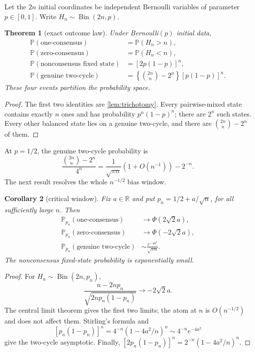 \documentclass[11pt,a4paper]{amsart}
\newtheorem{theorem}{Theorem}[section]
\newtheorem{corollary}[theorem]{Corollary}
\theoremstyle{definition}
\theoremstyle{remark}
\newcommand{\Bin}{\operatorname{Bin}}
\newcommand{\Prob}{\mathbb P}
\begin{document}
Let the $2n$ initial coordinates be independent Bernoulli variables of
parameter $p\in[0,1]$.  Write $H_n\sim\Bin(2n,p)$.

\begin{theorem}[exact outcome law]\label{thm:bernoulli}
Under Bernoulli$(p)$ initial data,
\begin{align*}
 \Prob(\text{one-consensus})&=\Prob(H_n>n),\\
 \Prob(\text{zero-consensus})&=\Prob(H_n<n),\\
 \Prob(\text{nonconsensus fixed state})&=[2p(1-p)]^n,\\
 \Prob(\text{genuine two-cycle})
 &=\left\{\binom{2n}{n}-2^n\right\}[p(1-p)]^n.
\end{align*}
These four events partition the probability space.
\end{theorem}

\begin{proof}
The first two identities are \cref{lem:trichotomy}.  Every pairwise-mixed
state contains exactly $n$ ones and has probability $p^n(1-p)^n$; there are
$2^n$ such states.  Every other balanced state lies on a genuine two-cycle,
and there are $\binom{2n}{n}-2^n$ of them.
\end{proof}

At $p=1/2$, the genuine two-cycle probability is
\[
 \frac{\binom{2n}{n}-2^n}{4^n}
 =\frac{1}{\sqrt{\pi n}}(1+O(n^{-1}))-2^{-n}.
\]
The next result resolves the whole $n^{-1/2}$ bias window.

\begin{corollary}[critical window]\label{cor:window}
Fix $a\in\mathbb R$ and put $p_n=1/2+a/\sqrt n$, for all sufficiently large
$n$.  Then
\begin{align*}
 \Prob_{p_n}(\text{one-consensus})&\longrightarrow\Phi(2\sqrt2a),\\
 \Prob_{p_n}(\text{zero-consensus})&\longrightarrow\Phi(-2\sqrt2a),\\
 \Prob_{p_n}(\text{genuine two-cycle})
 &\sim\frac{e^{-4a^2}}{\sqrt{\pi n}}.
\end{align*}
The nonconsensus fixed-state probability is exponentially small.
\end{corollary}

\begin{proof}
For $H_n\sim\Bin(2n,p_n)$,
\[
 \frac{n-2np_n}{\sqrt{2np_n(1-p_n)}}\longrightarrow-2\sqrt2a.
\]
The central limit theorem gives the first two limits; the atom at $n$ is
$O(n^{-1/2})$ and does not affect them.  Stirling's formula and
\[
 [p_n(1-p_n)]^n
 =4^{-n}(1-4a^2/n)^n
 \sim4^{-n}e^{-4a^2}
\]
give the two-cycle asymptotic.  Finally,
$[2p_n(1-p_n)]^n=2^{-n}(1-4a^2/n)^n$.
\end{proof}
\end{document}
